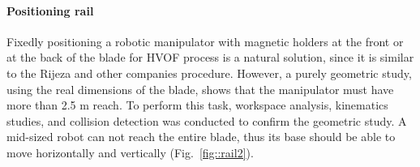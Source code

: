 

\paragraph{Positioning rail}
Fixedly positioning a robotic manipulator with magnetic holders at the front or
at the back of the blade for HVOF process is a natural solution, since it is
similar to the Rijeza and other companies procedure. However, a purely geometric
study, using the real dimensions of the blade, shows that the manipulator must
have more than 2.5 m reach. To perform this task, workspace analysis, kinematics
studies, and collision detection was conducted to confirm the geometric study. A mid-sized
robot can not reach the entire blade, thus its base should be able to move
horizontally and vertically (Fig.~\ref{fig::rail2}).

